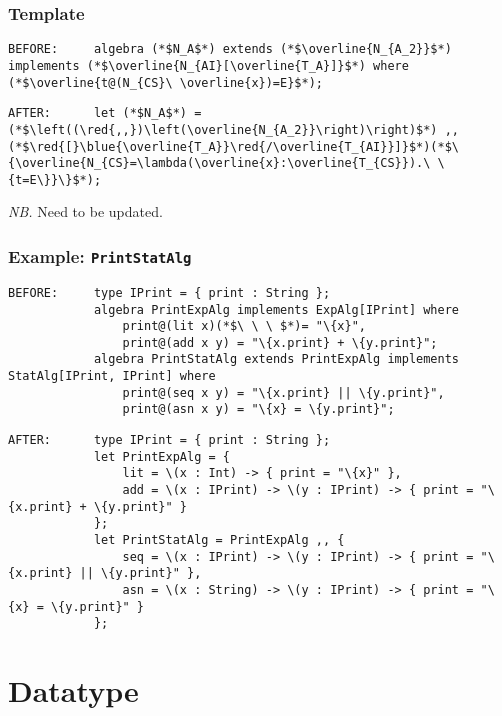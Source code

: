 \documentclass{article}
\newcommand{\red}[1]{\textcolor{red}{#1}}
\newcommand{\blue}[1]{\textcolor{blue}{#1}}
\newcommand{\nb}{\textit{NB. }}
\begin{document}
\begin{spacing}{1.1}
\subsubsection{Template}

\begin{lstlisting}[numbers=none]
BEFORE:     algebra (*$N_A$*) extends (*$\overline{N_{A_2}}$*) implements (*$\overline{N_{AI}[\overline{T_A}]}$*) where (*$\overline{t@(N_{CS}\ \overline{x})=E}$*);
\end{lstlisting}
\begin{lstlisting}[numbers=none]
AFTER:      let (*$N_A$*) =  (*$\left((\red{,,})\left(\overline{N_{A_2}}\right)\right)$*) ,, (*$\red{[}\blue{\overline{T_A}}\red{/\overline{T_{AI}}]}$*)(*$\{\overline{N_{CS}=\lambda(\overline{x}:\overline{T_{CS}}).\ \{t=E\}}\}$*);
\end{lstlisting}

\nb Need to be updated.

\subsubsection{Example: \lstinline{PrintStatAlg}}

\begin{lstlisting}[numbers=none]
BEFORE:     type IPrint = { print : String };
            algebra PrintExpAlg implements ExpAlg[IPrint] where
                print@(lit x)(*$\ \ \ $*)= "\{x}",
                print@(add x y) = "\{x.print} + \{y.print}";
            algebra PrintStatAlg extends PrintExpAlg implements StatAlg[IPrint, IPrint] where
                print@(seq x y) = "\{x.print} || \{y.print}",
                print@(asn x y) = "\{x} = \{y.print}";
\end{lstlisting}
\begin{lstlisting}[numbers=none]
AFTER:      type IPrint = { print : String };
            let PrintExpAlg = {
                lit = \(x : Int) -> { print = "\{x}" },
                add = \(x : IPrint) -> \(y : IPrint) -> { print = "\{x.print} + \{y.print}" }
            };
            let PrintStatAlg = PrintExpAlg ,, {
                seq = \(x : IPrint) -> \(y : IPrint) -> { print = "\{x.print} || \{y.print}" },
                asn = \(x : String) -> \(y : IPrint) -> { print = "\{x} = \{y.print}" }
            };
\end{lstlisting}

\section{Datatype}


\end{spacing}
\end{document}
